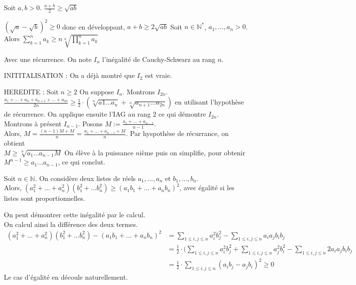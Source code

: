 \pro [Inégalité arithmético géométrique, cas $n=2$]

Soit $a, b >0$. $\frac{a+b}{2} \geq \sqrt{ab}$ 

\preuve 

$(\sqrt{a}-\sqrt{b} )^2 \geq 0$ donc en développant, $a+b \geq 2\sqrt{ab}$
Soit $n\in \mathbb{N^*}$, $a_1,\dots, a_n >0$. Alors $\sum_{k=1}^n a_k \geq n\sqrt[n]{\prod_{k=1}^na_k}$

\preuve Avec une récurrence. On note $I_n$ l'inégalité de Cauchy-Schwarz au rang $n$. 

INITITALISATION : On a déjà montré que $I_2$ est vraie. 

HEREDITE : Soit $n\geq 2$ On suppose $I_n$. Montrons $I_{2n}$. \\ $\frac{a_1+ \dots + a_n + a_{n+1} + \dots + a_{2n}}{2n} \geq \frac{1}{2} \cdot (\sqrt[n]{a1\dots a_n} + \sqrt[n]{a_{n+1}\dots a_{2n}})$ en utilisant l'hypothèse de récurrence. 
On applique ensuite l'IAG au rang $2$ ce qui démontre $I_{2n}$. \\ Montrons à présent $I_{n-1}$. Posons $M := \frac{a_1+\dots + a_{n-1}}{n-1}$. \\ Alors, $M = \frac{(n-1)M+M}{n} = \frac{a_1+\dots+a_{n-1} + M}{n}$. Par hyspothèse de récurrance, on obtient \\ $M \geq \sqrt[n]{a_1 \dots a_{n-1} M} $ On élève à la puissance $n$ième puis on simplifie, pour obtenir $M^{n-1} \geq a_1\dots a_{n-1}$, ce qui conclut. 


Soit $n \in \mathbb{N}$. On considère deux listes de réels $a_1, \dots, a_n$ et $b_1, \dots, b_n$. \\ Alors, $(a_1^2+\dots + a_n^2)(b_1^2+ \dots b_n^2) \geq (a_1b_1 + \dots + a_nb_n)^2$, avec égalité si les listes sont proportionnelles. 

\preuve On peut démontrer cette inégalité par le calcul. \\ On calcul ainsi la différence des deux termes. 
\begin{align*}
(a_1^2+\dots + a_n^2)(b_1^2+ \dots b_n^2)-(a_1b_1 + \dots + a_nb_n)^2 &= \sum_{1\leq i, j \leq n} a_i^2b_j^2 - \sum_{1 \leq i, j \leq n} a_ia_jb_ib_j \\
&= \frac{1}{2} \cdot (\sum_{1\leq i, j \leq n} a_i^2b_j^2 + \sum_{1\leq i, j \leq n} a_j^2b_i^2 - \sum_{1 \leq i, j \leq n} 2a_ia_jb_ib_j \\
&= \frac{1}{2} \cdot \sum_{1\leq i, j \leq n} (a_ib_j-a_jb_i)^2 \geq 0 
\end{align*}
Le cas d'égalité en découle naturellement. 

